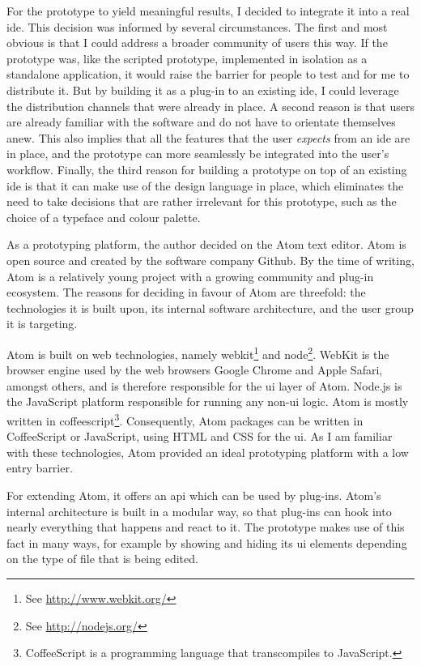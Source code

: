 For the prototype to yield meaningful results, I decided to integrate it
into a real \ac{ide}. This decision was informed by several
circumstances. The first and most obvious is that I could address a
broader community of users this way. If the prototype was, like the
scripted prototype, implemented in isolation as a standalone
application, it would raise the barrier for people to test and for me to
distribute it. But by building it as a plug-in to an existing \ac{ide},
I could leverage the distribution channels that were already in place. A
second reason is that users are already familiar with the software and
do not have to orientate themselves anew. This also implies that all the
features that the user \emph{expects} from an \ac{ide} are in place, and
the prototype can more seamlessly be integrated into the user’s
workflow. Finally, the third reason for building a prototype on top of
an existing \ac{ide} is that it can make use of the design language in
place, which eliminates the need to take decisions that are rather
irrelevant for this prototype, such as the choice of a typeface and
colour palette.

As a prototyping platform, the author decided on the Atom text editor.
Atom is open source and created by the software company Github. By the
time of writing, Atom is a relatively young project with a growing
community and plug-in ecosystem. The reasons for deciding in favour of
Atom are threefold: the technologies it is built upon, its internal
software architecture, and the user group it is targeting.

Atom is built on web technologies, namely
\gls{webkit}\footnote{See \url{http://www.webkit.org/}} and
\gls{node}\footnote{See \url{http://nodejs.org/}}. WebKit is the browser
engine used by the web browsers Google Chrome and Apple Safari, amongst
others, and is therefore responsible for the \acl{ui} layer of Atom.
Node.js is the JavaScript platform responsible for running any
non-\ac{ui} logic. Atom is mostly written in
\gls{coffeescript}\footnote{CoffeeScript is a programming language that transcompiles to JavaScript.}.
Consequently, Atom packages can be written in CoffeeScript or
JavaScript, using HTML and CSS for the \ac{ui}. As I am familiar with
these technologies, Atom provided an ideal prototyping platform with a
low entry barrier.

For extending Atom, it offers an \ac{api} which can be used by plug-ins.
Atom’s internal architecture is built in a modular way, so that plug-ins
can hook into nearly everything that happens and react to it. The
prototype makes use of this fact in many ways, for example by showing
and hiding its \ac{ui} elements depending on the type of file that is
being edited.


